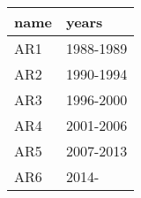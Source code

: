 \begin{tabular}{ll}
\toprule
name &      years \\
\midrule
 AR1 &  1988-1989 \\
 AR2 &  1990-1994 \\
 AR3 &  1996-2000 \\
 AR4 &  2001-2006 \\
 AR5 &  2007-2013 \\
 AR6 &      2014- \\
\bottomrule
\end{tabular}
